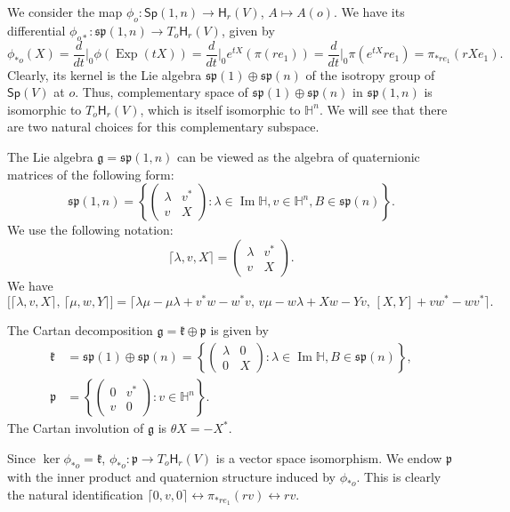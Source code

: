\documentclass[12pt, a4paper]{amsart}
\newcommand{\Exp}{\operatorname{Exp}}
\newcommand{\g}{\mathfrak}
\renewcommand{\H}{\mathbb{H}}
\renewcommand{\Im}{\operatorname{Im}}
\newcommand{\Sp}{\mathsf{Sp}}
\theoremstyle{remark}
\begin{document}
We consider the map $\phi_o\colon \Sp(1,n)\to\mathsf{H}_r(V)$, $A\mapsto A(o)$.
We have its differential $\phi_{o*}\colon\g{sp}(1,n)\to T_o\mathsf{H}_r(V)$, given by
\[
\phi_{*o}(X)
=\frac{d}{dt}\Big\vert_{0}\phi(\Exp(tX))
=\frac{d}{dt}\Big\vert_{0}e^{tX}(\pi(re_1))
=\frac{d}{dt}\Big\vert_{0}\pi(e^{tX}re_1)
=\pi_{*re_1}(rXe_1).
\]
Clearly, its kernel is the Lie algebra $\g{sp}(1)\oplus\g{sp}(n)$ of the isotropy group of $\Sp(V)$ at $o$.
Thus, complementary space of $\g{sp}(1)\oplus\g{sp}(n)$ in $\g{sp}(1,n)$ is isomorphic to $T_o\mathsf{H}_r(V)$, which is itself isomorphic to $\H^n$.
We will see that there are two natural choices for this complementary subspace.

The Lie algebra $\g{g}=\g{sp}(1,n)$ can be viewed as the algebra of quaternionic matrices of the following form:
\[
\g{sp}(1,n)=\left\{
\left(
\begin{array}{c|c}
\lambda & v^{*} \\
\hline
v & X
\end{array}
\right):
\lambda \in \Im \H,v\in \H^{n}, B\in \g{sp}(n)
\right\}.
\]
We use the following notation: 
\[
\lceil \lambda, v, X\rceil =\left(
\begin{array}{c|c}
\lambda & v^{*} \\
\hline
v & X
\end{array}
\right).
\]
We have
\[
\bigl[\lceil \lambda,v,X \rceil,\, \lceil \mu,w,Y \rceil\bigr]
=\lceil \lambda\mu-\mu\lambda+v^{*}w-w^{*}v,\, v\mu-w\lambda+Xw-Yv,\, [X,Y]+vw^{*}-wv^{*} \rceil.
\]

The Cartan decomposition $\g{g}=\g{k}\oplus\g{p}$ is given by
\[
\begin{aligned}
\g{k}&
{}=\g{sp}(1)\oplus\g{sp}(n)
=\left\{
	\left(
	\begin{array}{c|c}
		\lambda & 0 \\
		\hline
		0 & X
	\end{array}
	\right):
	\lambda \in \Im \H, B\in \g{sp}(n)
\right\}, \\
\g{p}&
{}=\left\{
\left(
	\begin{array}{c|c}
		0 & v^{*} \\
		\hline
		v & 0
	\end{array}
\right):
v\in \H ^{n}
\right\}.
\end{aligned}
\]
The Cartan involution of $\g{g}$ is $\theta X = -X^{*}$.

Since $\ker\phi_{*o}=\g{k}$, $\phi_{*o}\colon\g{p}\to T_o\mathsf{H}_r(V)$ is a vector space isomorphism.
We endow $\g{p}$ with the inner product and quaternion structure induced by $\phi_{*o}$.
This is clearly the natural identification $\lceil 0,v,0\rceil \leftrightarrow \pi_{*re_1}(rv) \leftrightarrow rv$.
\end{document}
